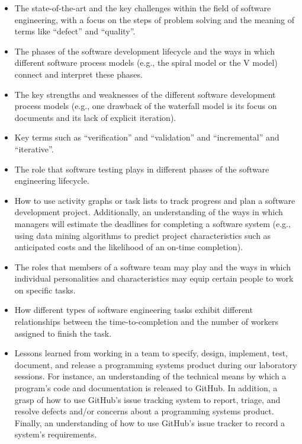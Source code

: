 \documentclass[11pt]{article}
\begin{document}
\vspace*{-.05in}
\begin{itemize}

  \item The state-of-the-art and the key challenges within the field of software
    engineering, with a focus on the steps of problem solving and the meaning of
    terms like ``defect'' and ``quality''.

  \item The phases of the software development lifecycle and the ways in which
    different software process models (e.g., the spiral model or the V model)
    connect and interpret these phases.

  \item The key strengths and weaknesses of the different software development
    process models (e.g., one drawback of the waterfall model is its focus on
    documents and its lack of explicit iteration).

  \item Key terms such as ``verification'' and ``validation'' and
    ``incremental'' and ``iterative''.

  \item The role that software testing plays in different phases of the software
    engineering lifecycle.

  \item How to use activity graphs or task lists to track progress and plan a
    software development project. Additionally, an understanding of the ways in
    which managers will estimate the deadlines for completing a software system
    (e.g., using data mining algorithms to predict project characteristics such
    as anticipated costs and the likelihood of an on-time completion).

  \item The roles that members of a software team may play and the ways in which
    individual personalities and characteristics may equip certain people to
    work on specific tasks.

  \item How different types of software engineering tasks exhibit different
    relationships between the time-to-completion and the number of workers
    assigned to finish the task.

  \item Lessons learned from working in a team to specify, design, implement,
    test, document, and release a programming systems product during our
    laboratory sessions. For instance, an understanding of the technical means
    by which a program's code and documentation is released to GitHub. In
    addition, a grasp of how to use GitHub's issue tracking system to report,
    triage, and resolve defects and/or concerns about a programming systems
    product. Finally, an understanding of how to use GitHub's issue tracker to
    record a system's requirements.


\end{itemize}
\end{document}
